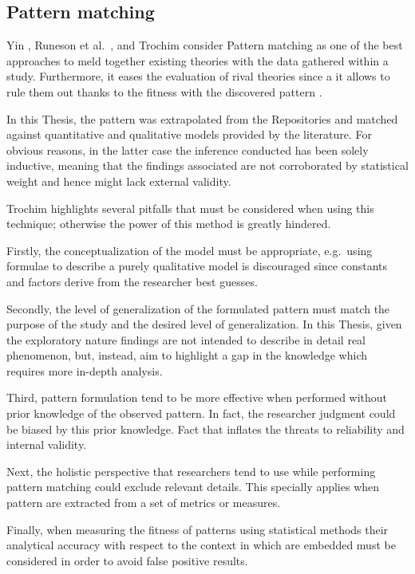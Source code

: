\subsection{Pattern matching}
Yin \cite{case_study_guide}, Runeson et al.\ \cite{case_study_software_engineering}, and Trochim \cite{pattern_matching} consider Pattern matching as one of the best approaches to meld together existing theories with the data gathered within a study. Furthermore, it eases the evaluation of rival theories since a it allows to rule them out thanks to the fitness with the discovered pattern \cite{pattern_matching}.

In this Thesis, the pattern was extrapolated from the Repositories and matched against quantitative and qualitative models provided by the literature. For obvious reasons, in the latter case the inference conducted has been solely inductive, meaning that the findings associated are not corroborated by statistical weight and hence might lack external validity.

Trochim \cite{pattern_matching} highlights several pitfalls that must be considered when using this technique; otherwise the power of this method is greatly hindered.

Firstly, the conceptualization of the model must be appropriate, e.g.\ using formulae to describe a purely qualitative model is discouraged since constants and factors derive from the researcher best guesses.

Secondly, the level of generalization of the formulated pattern must match the purpose of the study and the desired level of generalization. In this Thesis, given the exploratory nature findings are not intended to describe in detail real phenomenon, but, instead, aim to highlight a gap in the knowledge which requires more in-depth analysis.

Third, pattern formulation tend to be more effective when performed without prior knowledge of the observed pattern. In fact, the researcher judgment could be biased by this prior knowledge. Fact that inflates the threats to reliability and internal validity.

Next, the holistic perspective that researchers tend to use while performing pattern matching could exclude relevant details. This specially applies when pattern are extracted from a set of metrics or measures.

Finally, when measuring the fitness of patterns using statistical methods their analytical accuracy with respect to the context in which are embedded must be considered in order to avoid false positive results.
